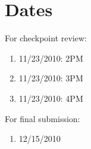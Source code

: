 \documentclass{article}
\begin{document}


\section{Dates} %
\label{sub:dates}

For checkpoint review:

\begin{enumerate}
  \item 11/23/2010: 2PM
  \item 11/23/2010: 3PM
  \item 11/23/2010: 4PM
\end{enumerate}

For final submission:

\begin{enumerate}
  \item 12/15/2010
\end{enumerate}

\end{document}
